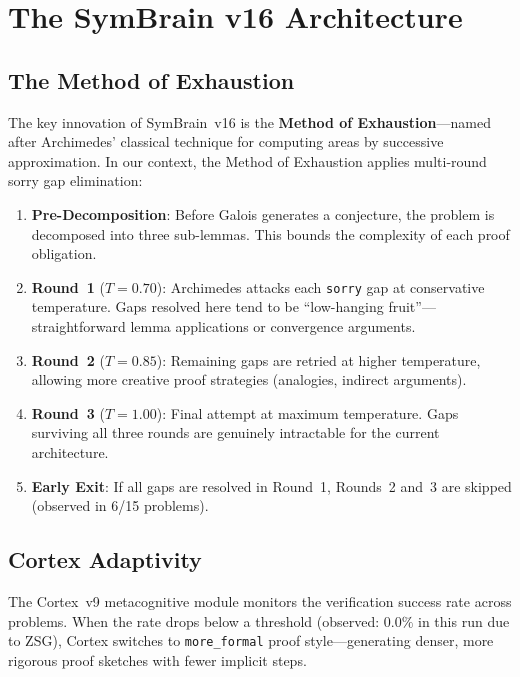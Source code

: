 \documentclass[12pt,a4paper]{report}
\theoremstyle{plain}
\theoremstyle{definition}
\theoremstyle{remark}
\newcommand{\sorry}{\textcolor{sorryred}{\texttt{sorry}}}
\begin{document}
\chapter{The SymBrain v16 Architecture}
\label{ch:arch}

\section{The Method of Exhaustion}

The key innovation of SymBrain~v16 is the \textbf{Method of Exhaustion}—named after
Archimedes' classical technique for computing areas by successive approximation. In our
context, the Method of Exhaustion applies multi-round sorry gap elimination:

\begin{enumerate}
  \item \textbf{Pre-Decomposition}: Before Galois generates a conjecture, the problem is
    decomposed into three sub-lemmas. This bounds the complexity of each proof obligation.
  \item \textbf{Round~1} ($T=0.70$): Archimedes attacks each \sorry{} gap at conservative
    temperature. Gaps resolved here tend to be ``low-hanging fruit''—straightforward lemma
    applications or convergence arguments.
  \item \textbf{Round~2} ($T=0.85$): Remaining gaps are retried at higher temperature,
    allowing more creative proof strategies (analogies, indirect arguments).
  \item \textbf{Round~3} ($T=1.00$): Final attempt at maximum temperature. Gaps surviving
    all three rounds are genuinely intractable for the current architecture.
  \item \textbf{Early Exit}: If all gaps are resolved in Round~1, Rounds~2 and~3 are
    skipped (observed in 6/15 problems).
\end{enumerate}

\section{Cortex Adaptivity}

The Cortex~v9 metacognitive module monitors the verification success rate across
problems. When the rate drops below a threshold (observed: $0.0\%$ in this run due to
ZSG), Cortex switches to \texttt{more\_formal} proof style—generating denser, more
rigorous proof sketches with fewer implicit steps.
\end{document}
